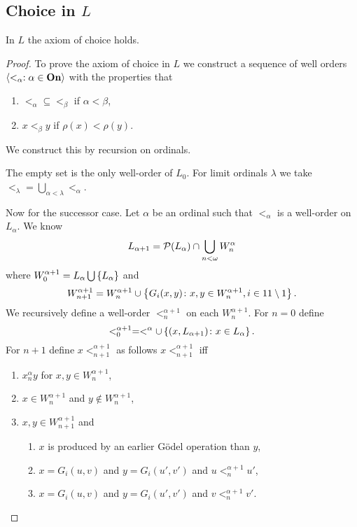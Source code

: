 \subsection{Choice in \texorpdfstring{\(L\)}{L}}

\begin{theorem}
    In \(L\) the axiom of choice holds.

    \begin{proof}
        To prove the axiom of choice in \(L\) we construct a sequence of well
        orders \(\left<<_{\alpha}:\alpha\in{\bf On}\right>\) with the properties
        that
        \begin{enumerate}
            \item \(<_{\alpha}\subseteq<_{\beta}\) if \(\alpha<\beta\),
            \item \(x<_{\beta}y\) if \(\rho(x)<\rho(y)\).
        \end{enumerate}

        We construct this by recursion on ordinals.

        The empty set is the only well-order of \(L_{0}\). For limit ordinals
        \(\lambda\) we take \(<_{\lambda}=\bigcup_{\alpha<\lambda}<_{\alpha}\).

        Now for the successor case. Let \(\alpha\) be an ordinal such that
        \(<_{\alpha}\) is a well-order on \(L_{\alpha}\). We know
        \[
            L_{\alpha+1}=\mathcal{P}(L_{\alpha})\cap\bigcup_{n<\omega}W^{\alpha}_{n}
        \]
        where \(W^{\alpha+1}_{0}=L_{\alpha}\bigcup\left\{L_{\alpha}\right\}\) and
        \[
            W^{\alpha+1}_{n+1}=W^{\alpha+1}_{n}\cup\left\{G_{i}(x,y)\colon x,y\in W^{\alpha+1}_{n},i\in11\setminus1\right\}.
        \]
        We recursively define a well-order \(<^{\alpha+1}_{n}\) on each
        \(W^{\alpha+1}_{n}\). For \(n=0\) define
        \[
            <^{\alpha+1}_{0}=<^{\alpha}\cup\left\{(x,L_{\alpha+1})\colon x\in L_{\alpha}\right\}.
        \]
        For \(n+1\) define \(x<^{\alpha+1}_{n+1}\) as follows
        \(x<^{\alpha+1}_{n+1}\) iff
        \begin{enumerate}
            \item \(x^{\alpha}_{n}y\) for \(x,y\in W^{\alpha+1}_{n}\),
            \item \(x\in W^{\alpha+1}_{n}\) and \(y\notin W^{\alpha+1}_{n}\),
            \item \(x,y\in W^{\alpha+1}_{n+1}\) and

                  \begin{enumerate}
                      \item \(x\) is produced by an earlier Gödel operation than
                            \(y\),
                      \item \(x=G_{i}(u,v)\) and \(y=G_{i}(u',v')\) and
                            \(u<^{\alpha+1}_{n}u'\),
                      \item \(x=G_{i}(u,v)\) and \(y=G_{i}(u',v')\) and
                            \(v<^{\alpha+1}_{n}v'\).
                  \end{enumerate}
        \end{enumerate}


\end{proof}
\end{theorem}
